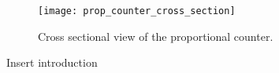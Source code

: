 \begin{figure}[!h]
  \centering
  \texttt{[image: prop\_counter\_cross\_section]}
  \caption{Cross sectional view of the proportional counter\autocite{Knoll:RadMeasurement}.}
  \label{fig:prop_count_cs}
\end{figure}
Insert introduction
